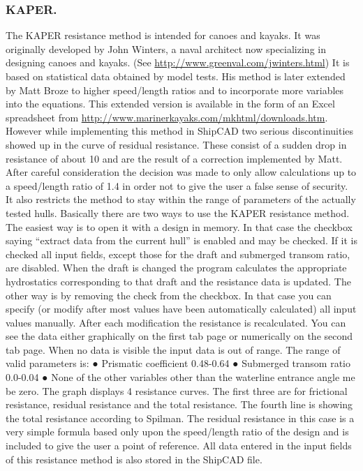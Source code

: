 \documentclass[12pt]{article}
\begin{document}
\subsubsection{KAPER.}
The KAPER resistance method is intended for canoes and kayaks. It was originally developed by
John Winters, a naval architect now specializing in designing canoes and kayaks. (See
\url{http://www.greenval.com/jwinters.html}) It is based on statistical data obtained by model tests. His
method is later extended by Matt Broze to higher speed/length ratios and to incorporate more
variables into the equations. This extended version is available in the form of an Excel spreadsheet
from \url{http://www.marinerkayaks.com/mkhtml/downloads.htm}. However while implementing this
method in ShipCAD two serious discontinuities showed up in the curve of residual resistance.
These consist of a sudden drop in resistance of about 10%
and are the result of a correction implemented by Matt. After careful consideration the decision was
made to only allow calculations up to a speed/length ratio of 1.4 in order not to give the user a false
sense of security. It also restricts the method to stay within the range of parameters of the actually
tested hulls.
Basically there are two ways to use the KAPER resistance method. The easiest way is to open it
with a design in memory. In that case the checkbox saying “extract data from the current hull” is
enabled and may be checked. If it is checked all input fields, except those for the draft and
submerged transom ratio, are disabled.
When the draft is changed the program
calculates the appropriate hydrostatics
corresponding to that draft and the resistance
data is updated. The other way is by
removing the check from the checkbox. In
that case you can specify (or modify after
most values have been automatically
calculated) all input values manually.
After each modification the resistance is
recalculated. You can see the data either
graphically on the first tab page or
numerically on the second tab page. When
no data is visible the input data is out of
range. The range of valid parameters is:
●
 Prismatic coefficient 0.48-0.64
●
 Submerged transom ratio 0.0-0.04
●
 None of the other variables other than the waterline entrance angle me be zero.
The graph displays 4 resistance curves. The first three are for frictional resistance, residual
resistance and the total resistance. The fourth line is showing the total resistance according to
Spilman. The residual resistance in this case is a very simple formula based only upon the
speed/length ratio of the design and is included to give the user a point of reference.
All data entered in the input fields of this resistance method is also stored in the ShipCAD file.
\end{document}
